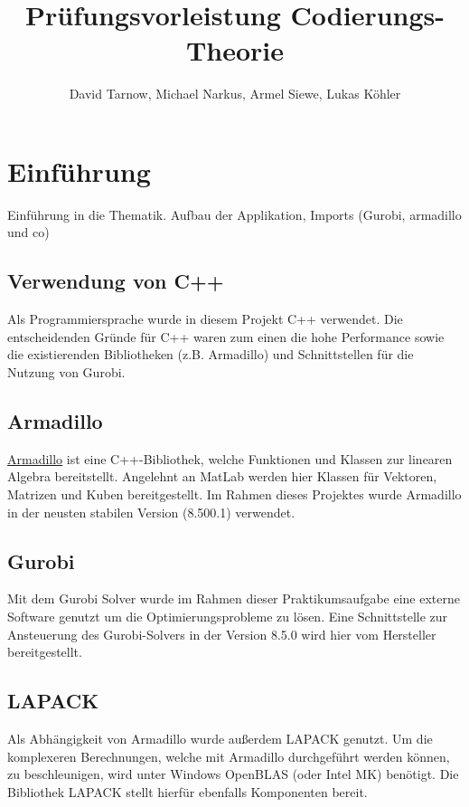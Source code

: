 \documentclass[12pt, titlepage]{article}
\begin{document}
\begin{titlepage}
	\title{Prüfungsvorleistung Codierungs-Theorie}
	\author{David Tarnow, Michael Narkus, Armel Siewe, Lukas Köhler}
	\maketitle
\end{titlepage}
	
\tableofcontents

\newpage









\section{Einführung}
Einführung in die Thematik. Aufbau der Applikation, Imports (Gurobi, armadillo und co)
\subsection{Verwendung von C++}
Als Programmiersprache wurde in diesem Projekt C++ verwendet. Die entscheidenden Gründe für C++ waren zum einen die hohe Performance sowie die existierenden Bibliotheken (z.B. Armadillo) und Schnittstellen für die Nutzung von Gurobi.  
\subsection{Armadillo}
\href{http://arma.sourceforge.net/}{Armadillo} ist eine C++-Bibliothek, welche Funktionen und Klassen zur linearen Algebra bereitstellt. Angelehnt an MatLab werden hier Klassen für Vektoren, Matrizen und Kuben bereitgestellt.
Im Rahmen dieses Projektes wurde Armadillo in der neusten stabilen Version (8.500.1) verwendet. \\
\subsection{Gurobi}
Mit dem Gurobi Solver wurde im Rahmen dieser Praktikumsaufgabe eine externe Software genutzt um die Optimierungsprobleme zu lösen. Eine Schnittstelle zur Ansteuerung des Gurobi-Solvers in der Version 8.5.0 wird hier vom Hersteller bereitgestellt. 
\subsection{LAPACK}
Als Abhängigkeit von Armadillo wurde außerdem LAPACK genutzt. Um die komplexeren Berechnungen, welche mit Armadillo durchgeführt werden können, zu beschleunigen, wird unter Windows OpenBLAS (oder Intel MK) benötigt. Die Bibliothek LAPACK stellt hierfür ebenfalls Komponenten bereit.
\end{document}
